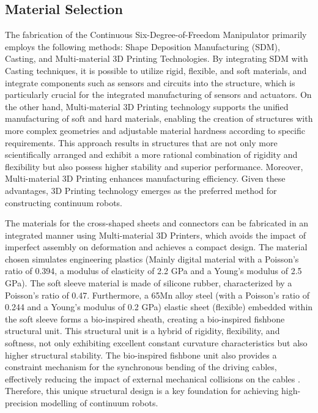 \subsection{Material Selection}
The fabrication of the Continuous Six-Degree-of-Freedom Manipulator primarily employs the following methods: Shape 
Deposition Manufacturing (SDM)\cite{fast_and_robust}, Casting\cite{recipe2015,high_force}, and Multi-material 3D 
Printing Technologies\cite{evolution2016,3Dprint_design}. By integrating SDM with Casting techniques, it is possible 
to utilize rigid, flexible, and soft materials, and integrate components such as sensors and circuits into the structure, 
which is particularly crucial for the integrated manufacturing of sensors and actuators. On the other hand, Multi-material 
3D Printing technology supports the unified manufacturing of soft and hard materials, enabling the creation of structures 
with more complex geometries and adjustable material hardness according to specific requirements. This approach results 
in structures that are not only more scientifically arranged and exhibit a more rational combination of rigidity and 
flexibility but also possess higher stability and superior performance. Moreover, Multi-material 3D Printing enhances 
manufacturing efficiency. Given these advantages, 3D Printing technology emerges as the preferred method for constructing 
continuum robots.

The materials for the cross-shaped sheets and connectors can be fabricated in an integrated manner using Multi-material 
3D Printers, which avoids the impact of imperfect assembly on deformation and achieves a compact design. The material 
chosen simulates engineering plastics (Mainly digital material with a Poisson's ratio of 0.394, a modulus of elasticity 
of 2.2 GPa and a Young's modulus of 2.5 GPa). The soft sleeve material is made of silicone rubber, characterized by a 
Poisson's ratio of 0.47. Furthermore, a 65Mn alloy steel (with a Poisson's ratio of 0.244 and a Young's modulus of 0.2 
GPa) elastic sheet (flexible) embedded within the soft sleeve forms a bio-inspired sheath, creating a bio-inspired 
fishbone structural unit. This structural unit is a hybrid of rigidity, flexibility, and softness, not only exhibiting 
excellent constant curvature characteristics but also higher structural stability. The bio-inspired fishbone unit also 
provides a constraint mechanism for the synchronous bending of the driving cables, effectively reducing the impact of 
external mechanical collisions on the cables \cite{fishboneCR}. Therefore, this unique structural design is a key 
foundation for achieving high-precision modelling of continuum robots.

